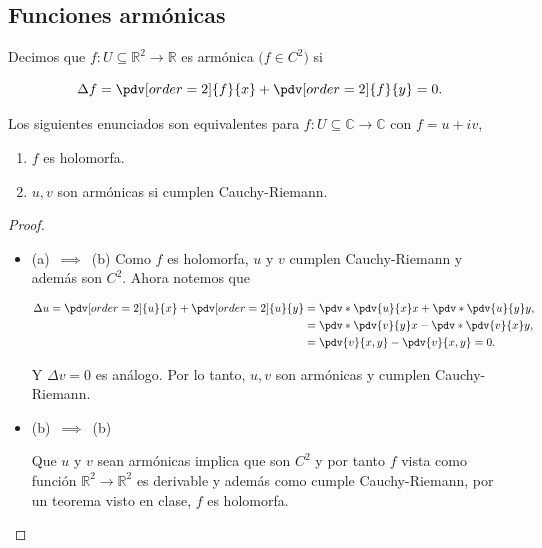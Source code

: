 \documentclass[../main.tex]{subfiles}
\begin{document}
\subsection{Funciones armónicas}

\begin{definition}
	Decimos que \(f \colon U \subseteq \mathbb{R}^{2} \to \mathbb{R}\) es armónica
	\(\bigl(f \in C^{2}\bigr)\) si

	\begin{equation}
		\Delta{f} = \pdv[order = 2]{f}{x} + \pdv[order = 2]{f}{y} = 0.
	\end{equation}
\end{definition}

\begin{proposition}
	Los siguientes enunciados son equivalentes para \(f \colon U \subseteq \mathbb{C}
	\to \mathbb{C}\) con \(f = u + iv\),

	\begin{enumerate}
		\item \(f\) es holomorfa.
		\item \(u,v\) son armónicas si cumplen Cauchy-Riemann.
	\end{enumerate}
\end{proposition}

\begin{proof}
	\begin{itemize}
		\item (a) \(\,\implies\,\) (b)
		      Como \( f\) es holomorfa, \(u\) y \(v\) cumplen Cauchy-Riemann y además son
		      \(C^{2}\).
		      Ahora notemos que

		      \begin{align*}
			      \Delta{u} = \pdv[order = 2]{u}{x} + \pdv[order = 2]{u}{y} & =
			      \pdv*{\pdv{u}{x}}{x} + \pdv*{\pdv{u}{y}}{y},                                                                        \\
			                                                                & = \pdv*{\pdv{v}{y}}{x} - \pdv*{\pdv{v}{x}}{y},\nonumber \\
			                                                                & = \pdv{v}{x,y} - \pdv{v}{x,y} = 0.
		      \end{align*}

		      Y \(\Delta{v} = 0\) es análogo. Por lo tanto, \(u,v\) son armónicas y cumplen
		      Cauchy-Riemann.

		\item (b) \(\,\implies\,\) (b)

		      Que \(u\) y \(v\) sean armónicas implica que son \(C^{2}\) y por tanto \(f\) vista como
		      función \(\mathbb{R}^{2} \to \mathbb{R}^{2}\) es derivable y además como cumple
		      Cauchy-Riemann, por un teorema visto en clase, \(f\) es holomorfa.
	\end{itemize}
\end{proof}
\end{document}
